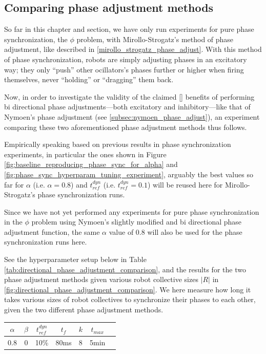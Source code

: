 	
	\subsection{Comparing phase adjustment methods}
	So far in this chapter and section, we have only run experiments for pure phase synchronization, the $\phi$ problem, with Mirollo-Strogatz's method of phase adjustment, like described in \ref{mirollo_strogatz_phase_adjust}. With this method of phase synchronization, robots are simply adjusting phases in an excitatory way; they only ``push'' other ocillators's phases further or higher when firing themselves, never ``holding'' or ``dragging'' them back.
	
	Now, in order to investigate the validity of the claimed [] benefits of performing bi directional phase adjustments—both excitatory and inhibitory—like that of Nymoen's phase adjustment (see \ref{subsec:nymoen_phase_adjust}), an experiment comparing these two aforementioned phase adjustment methods thus follows.
	
	Empirically speaking based on previous results in phase synchronization experiments, in particular the ones shown in Figure \ref{fig:baseline_reproducing_phase_sync_for_alpha} and \ref{fig:phase_sync_hyperparam_tuning_experiment}, arguably the best values so far for $\alpha$ (i.e. $\alpha=0.8$) and $t_{ref}^{dyn}$ (i.e. $t_{ref}^{dyn}=0.1$) will be reused here for Mirollo-Strogatz's phase synchronization runs.
	
	Since we have not yet performed any experiments for pure phase synchronization in the $\phi$ problem using Nymoen's slightly modified and bi directional phase adjustment function, the same $\alpha$ value of 0.8 will also be used for the phase synchronization runs here.
	
	See the hyperparameter setup below in Table \ref{tab:directional_phase_adjustment_comparison}, and the results for the two phase adjustment methods given various robot collective sizes $|R|$ in \ref{fig:directional_phase_adjustment_comparison}. We here measure how long it takes various sizes of robot collectives to synchronize their phases to each other, given the two different phase adjustment methods.
	
	\begin{center}
	\begin{tabular}{ |c|c|c|c|c|c|c| } 
	\hline
	$\alpha$ & $\beta$ & $t_{ref}^{dyn}$ & $t_f$ & $k$ & $t_{max}$ \\
	\hline
	0.8 & 0 & 10\% & 80ms & 8 & 5min \\
	\hline
	\end{tabular}
	\label{tab:directional_phase_adjustment_comparison}
	\end{center}
	
